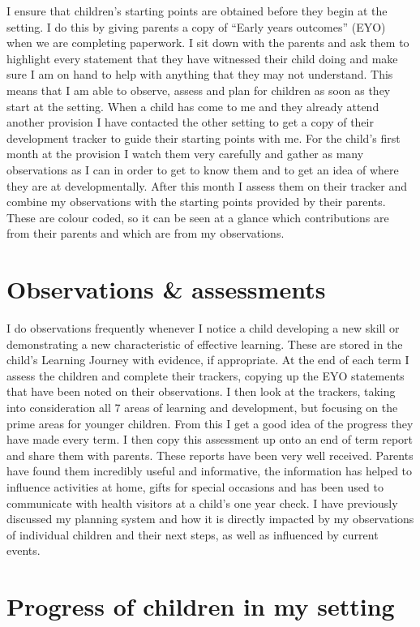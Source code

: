\documentclass[10pt,a4paper]{report}
\begin{document}
I ensure that children's starting points are obtained before they begin at the setting. I do this by giving parents a copy of “Early years outcomes” (EYO) when we are completing paperwork. I sit down with the parents and ask them to highlight every statement that they have witnessed their child doing and make sure I am on hand to help with anything that they may not understand. This means that I am able to observe, assess and plan for children as soon as they start at the setting. When a child has come to me and they already attend another provision I have contacted the other setting to get a copy of their development tracker to guide their starting points with me. For the child's first month at the provision I watch them very carefully and gather as many observations as I can in order to get to know them and to get an idea of where they are at developmentally. After this month I assess them on their tracker and combine my observations with the starting points provided by their parents. These are colour coded, so it can be seen at a glance which contributions are from their parents and which are from my observations.

\section{Observations \& assessments}

I do observations frequently whenever I notice a child developing a new skill or demonstrating a new characteristic of effective learning. These are stored in the child's Learning Journey with evidence, if appropriate. At the end of each term I assess the children and complete their trackers, copying up the EYO statements that have been noted on their observations. I then look at the trackers, taking into consideration all 7 areas of learning and development, but focusing on the prime areas for younger children. From this I get a good idea of the progress they have made every term. I then copy this assessment up onto an end of term report and share them with parents. These reports have been very well received. Parents have found them incredibly useful and informative, the information has helped to influence activities at home, gifts for special occasions and has been used to communicate with health visitors at a child's one year check. I have previously discussed my planning system and how it is directly impacted by my observations of individual children and their next steps, as well as influenced by current events.

\section{Progress of children in my setting}
\end{document}

